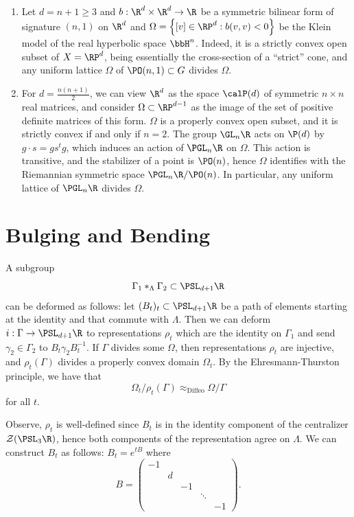 \documentclass{article}
\begin{document}
\begin{example}
	\begin{enumerate}
		\item Let $d = n + 1 \geq 3$ and $b: \R^d \times \R^d \to \R$ be a symmetric bilinear form of signature $(n,1)$ on $\R^d$ and $\Omega = \left\{ [v] \in \RP^d : b(v,v) < 0 \right\}$ be the Klein model of the real hyperbolic space $\bbH^n$. Indeed, it is a strictly convex open subset of $X = \RP^d$, being essentially the cross-section of a ``strict'' cone, and any uniform lattice $\Omega$ of $\PO(n,1) \subset G$ divides $\Omega$.
		\item For $d = \frac{n(n + 1)}{2}$, we can view $\R^d$ as the space $\calP(d)$ of symmetric $n \times n$ real matrices, and consider $\Omega \subset \RP^{d - 1}$ as the image of the set of positive definite matrices of this form. $\Omega$ is a properly convex open subset, and it is strictly convex if and only if $n = 2$. The group $\GL_n\R$ acts on $\P(d)$ by $g \cdot s = gs^tg$, which induces an action of $\PGL_n\R$ on $\Omega$. This action is transitive, and the stabilizer of a point is $\PO(n)$, hence $\Omega$ identifies with the Riemannian symmetric space $\PGL_n\R/\PO(n)$. In particular, any uniform lattice of $\PGL_n\R$ divides $\Omega$.
	\end{enumerate}
\end{example}

\section{Bulging and Bending}

A subgroup \[\Gamma_1 *_\Lambda \Gamma_2 \subset \PSL_{d + 1}\R\] can be deformed as follows: let $(B_t)_t \subset \PSL_{d + 1}\R$ be a path of elements starting at the identity and that commute with $\Lambda$. Then we can deform $i: \Gamma \to \PSL_{d + 1}\R$ to representations $\rho_t$ which are the identity on $\Gamma_1$ and send $\gamma_2 \in \Gamma_2$ to $B_t\gamma_2B_t^{-1}$. If $\Gamma$ divides some $\Omega$, then representations $\rho_t$ are injective, and $\rho_t(\Gamma)$ divides a properly convex domain $\Omega_t$. By the Ehresmann-Thurston principle, we have that \[\Omega_t/\rho_t(\Gamma) \approx_{\text{Diffeo}} \Omega/\Gamma\] for all $t$.

Observe, $\rho_t$ is well-defined since $B_t$ is in the identity component of the centralizer $\mathcal{Z}(\PSL_3\R)$, hence both components of the representation agree on $\Lambda$. We can construct $B_t$ as follows: $B_t = e^{tB}$ where \[B = \begin{pmatrix} -1 \\ &d \\ &&-1 \\ &&&\ddots \\ &&&&-1 \end{pmatrix}. \]  
\end{document}
